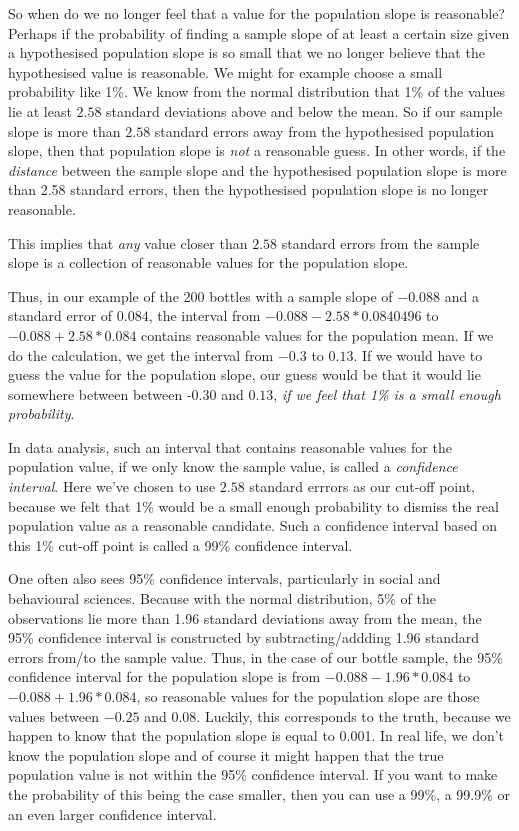 \documentclass[]{report}\usepackage[]{graphicx}\usepackage[]{color}
\begin{document}
So when do we no longer feel that a value for the population slope is reasonable? Perhaps if the probability of finding a sample slope of at least a certain size given a hypothesised population slope is so small that we no longer believe that the hypothesised value is reasonable. We might for example choose a small probability like 1\%. We know from the normal distribution that 1\% of the values lie at least $2.58$ standard deviations above and below the mean. So if our sample slope is more than $2.58$ standard errors away from the hypothesised population slope, then that population slope is \textit{not} a reasonable guess. In other words, if the \textit{distance} between the sample slope and the hypothesised population slope is more than 2.58 standard errors, then the hypothesised population slope is no longer reasonable.

This implies that \textit{any} value closer than $2.58$ standard errors from the sample slope is a collection of reasonable values for the population slope.

Thus, in our example of the 200 bottles with a sample slope of $-0.088$ and a standard error of $0.084$, the interval from $-0.088- 2.58* 0.0840496$ to $-0.088+ 2.58* 0.084$ contains reasonable values for the population mean. If we do the calculation, we get the interval from $-0.3$ to $0.13$. If we would have to guess the value for the population slope, our guess would be that it would lie somewhere between between -0.30 and $0.13$, \textit{if we feel that 1\% is a small enough probability}.

In data analysis, such an interval that contains reasonable values for the population value, if we only know the sample value, is called a \textit{confidence interval}. Here we've chosen to use $2.58$ standard errrors as our cut-off point, because we felt that 1\% would be a small enough probability to dismiss the real population value as a reasonable candidate. Such a confidence interval based on this 1\% cut-off point is called a 99\% confidence interval.

One often also sees 95\% confidence intervals, particularly in social and behavioural sciences. Because with the normal distribution, 5\% of the observations lie more than 1.96 standard deviations away from the mean, the 95\% confidence interval is constructed by subtracting/addding 1.96 standard errors from/to the sample value. Thus, in the case of our bottle sample, the 95\% confidence interval for the population slope is from $-0.088- 1.96* 0.084$ to $-0.088+ 1.96* 0.084$, so reasonable values for the population slope are those values between $-0.25$ and $0.08$. Luckily, this corresponds to the truth, because we happen to know that the population slope is equal to 0.001. In real life, we don't know the population slope and of course it might happen that the true population value is not within the 95\% confidence interval. If you want to make the probability of this being the case smaller, then you can use a 99\%, a 99.9\% or an even larger confidence interval.
\end{document}
